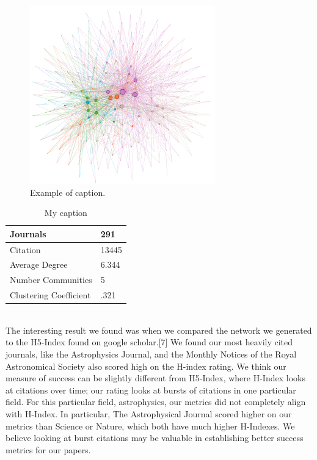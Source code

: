 \documentclass[times, 10pt,twocolumn]{article}
\begin{document}
\begin{figure}[h]
   \includegraphics[width=8cm]{figure3.png}
   \caption{Example of caption.}
\end{figure}

\begin{table}[]
\centering
\caption{My caption}
\label{my-label}
\begin{tabular}{|l|l|}
\hline
Journals               & 291   \\ \hline
Citation               & 13445 \\ \hline
Average Degree         & 6.344 \\ \hline
Number Communities     & 5     \\ \hline
Clustering Coefficient & .321  \\ \hline
\end{tabular}
\end{table}
\\

The interesting result we found was when we compared the network we generated to the H5-Index found on google scholar.[7] We found our most heavily cited journals, like the Astrophysics Journal, and the Monthly Notices of the Royal Astronomical Society also scored high on the H-index rating. We think our measure of success can be slightly different from H5-Index, where H-Index looks at citations over time; our rating looks at bursts of citations in one particular field. For this particular field, astrophysics, our metrics did not completely align with H-Index. In particular, The Astrophysical Journal scored higher on our metrics than Science or Nature, which both have much higher H-Indexes. We believe looking at burst citations may be valuable in establishing better success metrics for our papers.\\
\end{document}
